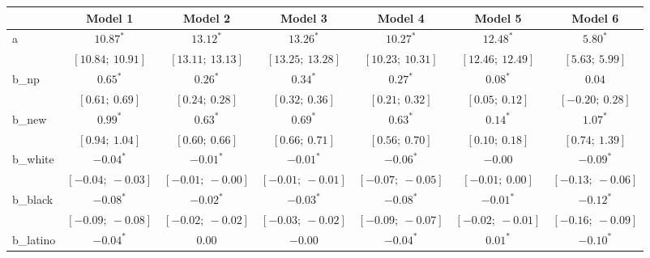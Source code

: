 
\begin{table}
\begin{center}
\begin{tabular}{l c c c c c c }
\hline
 & Model 1 & Model 2 & Model 3 & Model 4 & Model 5 & Model 6 \\
\hline
a         & $10.87^{*}$               & $13.12^{*}$               & $13.26^{*}$               & $10.27^{*}$             & $12.48^{*}$               & $5.80^{*}$            \\
          & $[10.84;\ 10.91]$         & $[13.11;\ 13.13]$         & $[13.25;\ 13.28]$         & $[10.23;\ 10.31]$       & $[12.46;\ 12.49]$         & $[5.63;\ 5.99]$       \\
b\_np     & $0.65^{*}$                & $0.26^{*}$                & $0.34^{*}$                & $0.27^{*}$              & $0.08^{*}$                & $0.04$                \\
          & $[0.61;\ 0.69]$           & $[0.24;\ 0.28]$           & $[0.32;\ 0.36]$           & $[0.21;\ 0.32]$         & $[0.05;\ 0.12]$           & $[-0.20;\ 0.28]$      \\
b\_new    & $0.99^{*}$                & $0.63^{*}$                & $0.69^{*}$                & $0.63^{*}$              & $0.14^{*}$                & $1.07^{*}$            \\
          & $[0.94;\ 1.04]$           & $[0.60;\ 0.66]$           & $[0.66;\ 0.71]$           & $[0.56;\ 0.70]$         & $[0.10;\ 0.18]$           & $[0.74;\ 1.39]$       \\
b\_white  & $-0.04^{*}$               & $-0.01^{*}$               & $-0.01^{*}$               & $-0.06^{*}$             & $-0.00$                   & $-0.09^{*}$           \\
          & $[-0.04;\ -0.03]$         & $[-0.01;\ -0.00]$         & $[-0.01;\ -0.01]$         & $[-0.07;\ -0.05]$       & $[-0.01;\ 0.00]$          & $[-0.13;\ -0.06]$     \\
b\_black  & $-0.08^{*}$               & $-0.02^{*}$               & $-0.03^{*}$               & $-0.08^{*}$             & $-0.01^{*}$               & $-0.12^{*}$           \\
          & $[-0.09;\ -0.08]$         & $[-0.02;\ -0.02]$         & $[-0.03;\ -0.02]$         & $[-0.09;\ -0.07]$       & $[-0.02;\ -0.01]$         & $[-0.16;\ -0.09]$     \\
b\_latino & $-0.04^{*}$               & $0.00$                    & $-0.00$                   & $-0.04^{*}$             & $0.01^{*}$                & $-0.10^{*}$           \\

\end{tabular}
\end{center}
\end{table}
